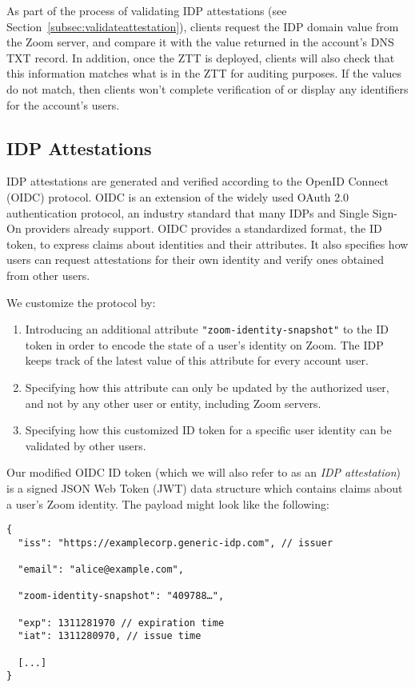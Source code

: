 As part of the process of validating IDP attestations (see
Section~\ref{subsec:validateattestation}), clients request the IDP domain value
from the Zoom server, and compare it with the value returned in the account's
DNS TXT record. In addition, once the ZTT is deployed, clients will also check
that this information matches what is in the ZTT for auditing purposes. If the
values do not match, then clients won't complete verification of or display any
identifiers for the account's users.

\subsection{IDP Attestations}

IDP attestations are generated and verified according to the OpenID Connect (OIDC) protocol.
OIDC is an extension of the widely used OAuth 2.0 authentication protocol, an industry standard that
many IDPs and Single Sign-On providers already support. OIDC provides a standardized format, the
ID token, to express claims about identities and their attributes. It also specifies how users can
request attestations for their own identity and verify ones obtained from other users.

We customize the protocol by:

\begin{enumerate}
\item Introducing an additional attribute \texttt{"zoom-identity-snapshot"} to the ID token in order
    to encode the state of a user's identity on Zoom. The IDP keeps track of the latest value of
    this attribute for every account user.
\item Specifying how this attribute can only be updated by the authorized user, and not by any other
    user or entity, including Zoom servers.
\item Specifying how this customized ID token for a specific user identity can be validated by other users.
\end{enumerate}

Our modified OIDC ID token (which we will also refer to as an \textit{IDP
attestation}) is a signed JSON Web Token (JWT) data structure which contains
claims about a user’s Zoom identity. The payload might
look like the following:

\begin{Verbatim}
{
  "iss": "https://examplecorp.generic-idp.com", // issuer

  "email": "alice@example.com",

  "zoom-identity-snapshot": "409788…",

  "exp": 1311281970 // expiration time
  "iat": 1311280970, // issue time

  [...]
}
\end{Verbatim}

